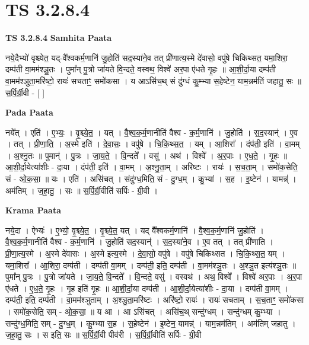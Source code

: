 \documentclass[17pt]{extarticle}
\begin{document}
\section{ TS 3.2.8.4 }

\textbf{TS 3.2.8.4 } \newline
\textbf{Samhita Paata} \newline

नये॒दैभ्यो॑ वृश्च्येत॒ यद्-वै᳚श्वकर्म॒णानि॑ जु॒होति॑ सद॒स्या॑ने॒व तत् प्री॑णात्य॒स्मे दे॑वासो॒ वपु॑षे चिकिथ्सत॒ यमा॒शिरा॒ दम्प॑ती वा॒मम॑श्ञु॒तः । पुमा᳚न् पु॒त्रो जा॑यते वि॒न्दते॒ वस्वथ॒ विश्वे॑ अर॒पा ए॑धते गृ॒हः ॥ आ॒शी॒र्दा॒या दम्प॑ती वा॒मम॑श्ञुता॒मरि॑ष्टो॒ रायः॑ सचताꣳ॒॒ समो॑कसा । य आऽसि॑च॒थ् सं दु॑ग्धं कु॒म्भ्या स॒हेष्टेन॒ याम॒न्नम॑तिं जहातु॒ सः ॥ स॒र्पि॒र्ग्री॒वी - [  ] \newline

\textbf{Pada Paata} \newline

नये᳚त् । एति॑ । ए॒भ्यः॒ । वृ॒श्च्ये॒त॒ । यत् । वै॒श्व॒क॒र्म॒णानीति॑ वैश्व - क॒र्म॒णानि॑ । जु॒होति॑ । स॒द॒स्यान्॑ । ए॒व । तत् । प्री॒णा॒ति॒ । अ॒स्मे इति॑ । दे॒वा॒सः॒ । वपु॑षे । चि॒कि॒थ्स॒त॒ । यम् । आ॒शिरा᳚ । दंप॑ती॒ इति॑ । वा॒मम् । अ॒श्नु॒तः ॥ पुमान्॑ । पु॒त्रः । जा॒य॒ते॒ । वि॒न्दते᳚ । वसु॑ । अथ॑ । विश्वे᳚ । अ॒र॒पाः । ए॒ध॒ते॒ । गृ॒हः ॥ आ॒शी॒र्दा॒येत्या॑शीः - दा॒या । दंप॑ती॒ इति॑ । वा॒मम् । अ॒श्नु॒ता॒म् । अरि॑ष्टः । रायः॑ । स॒च॒ता॒म् । समो॑क॒सेति॒ सं - ओ॒क॒सा॒ ॥ यः । एति॑ । असि॑चत् । संदु॑ग्ध॒मिति॒ सं - दु॒ग्ध॒म् । कु॒भ्यां । स॒ह । इ॒ष्टेन॑ । यामन्न्॑ । अम॑तिम् । ज॒हा॒तु॒ । सः ॥ स॒र्पि॒र्ग्री॒वीति॑ सर्पिः - ग्री॒वी ।  \newline


\textbf{Krama Paata} \newline

नये॒दा । ऐभ्यः॑ । ए॒भ्यो॒ वृ॒श्च्ये॒त॒ । वृ॒श्च्ये॒त॒ यत् । यद् वै᳚श्वकर्म॒णानि॑ । वै॒श्व॒क॒र्म॒णानि॑ जु॒होति॑ । वै॒श्व॒क॒र्म॒णानीति॑ वैश्व - क॒र्म॒णानि॑ । जु॒होति॑ सद॒स्यान्॑ । स॒द॒स्या॑ने॒व । ए॒व तत् । तत् प्री॑णाति । प्री॒णा॒त्य॒स्मे । अ॒स्मे दे॑वासः । अ॒स्मे इत्य॒स्मे । दे॒वा॒सो॒ वपु॑षे । वपु॑षे चिकिथ्सत । चि॒कि॒थ्स॒त॒ यम् । यमा॒शिरा᳚ । आ॒शिरा॒ दम्प॑ती । दम्प॑ती वा॒मम् । दम्प॑ती॒ इति॒ दम्प॑ती । वा॒मम॑श्ञु॒तः । अ॒श्ञु॒त इत्य॑श्ञु॒तः ॥ पुमा᳚न् पु॒त्रः । पु॒त्रो जा॑यते । जा॒य॒ते॒ वि॒न्दते᳚ । वि॒न्दते॒ वसु॑ । वस्वथ॑ । अथ॒ विश्वे᳚ । विश्वे॑ अर॒पाः । अ॒र॒पा ए॑धते । ए॒ध॒ते॒ गृ॒हः । गृ॒ह इति॑ गृ॒हः ॥ आ॒शी॒र्दा॒या दम्प॑ती । आ॒शी॒र्दा॒येत्या॑शीः - दा॒या । दम्प॑ती वा॒मम् । दम्प॑ती॒ इति॒ दम्प॑ती । वा॒मम॑श्ञुताम् । अ॒श्ञु॒ता॒मरि॑ष्टः । अरि॑ष्टो॒ रायः॑ । रायः॑ सचताम् । स॒च॒ताꣳ॒॒ समो॑कसा । समो॑क॒सेति॒ सम् - ओ॒क॒सा॒ ॥ य आ । आ ऽसि॑चत् । असि॑च॒थ् सन्दु॑ग्धम् । सन्दु॑ग्धम् कु॒म्भ्या । सन्दु॑ग्ध॒मिति॒ सम् - दु॒ग्ध॒म् । कु॒म्भ्या स॒ह । स॒हेष्टेन॑ । इ॒ष्टेन॒ यामन्न्॑ । याम॒न्नम॑तिम् । अम॑तिम् जहातु । ज॒हा॒तु॒ सः । स इति॒ सः ॥ स॒र्पि॒र्ग्री॒वी पीव॑री । स॒र्पि॒र्ग्री॒वीति॑ सर्पिः - ग्री॒वी \newline
\end{document}
